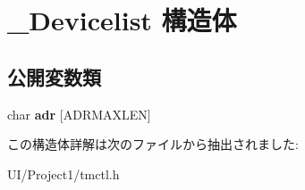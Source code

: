 \hypertarget{struct___devicelist}{}\section{\+\_\+\+Devicelist 構造体}
\label{struct___devicelist}
\subsection*{公開変数類}
\begin{DoxyCompactItemize}
\item 
\mbox{\label{struct___devicelist_a9a7c1d6e49926f29e7b0d45717c7891c}} 
char {\bfseries adr} \mbox{[}A\+D\+R\+M\+A\+X\+L\+EN\mbox{]}
\end{DoxyCompactItemize}


この構造体詳解は次のファイルから抽出されました\+:\begin{DoxyCompactItemize}
\item 
U\+I/\+Project1/tmctl.\+h\end{DoxyCompactItemize}
